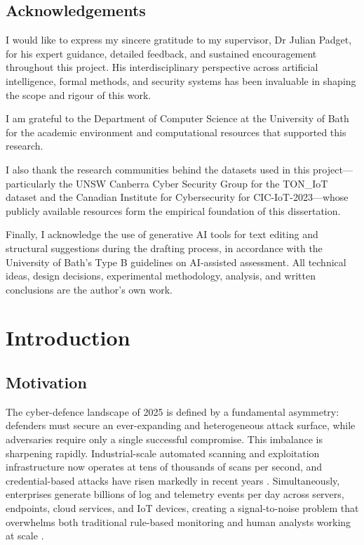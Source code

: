 \documentclass[12pt,a4paper]{report}
\begin{document}
\newpage
\section*{Acknowledgements}
I would like to express my sincere gratitude to my supervisor, Dr Julian Padget, for his expert guidance, detailed feedback, and sustained encouragement throughout this project. His interdisciplinary perspective across artificial intelligence, formal methods, and security systems has been invaluable in shaping the scope and rigour of this work.

I am grateful to the Department of Computer Science at the University of Bath for the academic environment and computational resources that supported this research.

I also thank the research communities behind the datasets used in this project---particularly the UNSW Canberra Cyber Security Group for the TON\_IoT dataset and the Canadian Institute for Cybersecurity for CIC-IoT-2023---whose publicly available resources form the empirical foundation of this dissertation.

Finally, I acknowledge the use of generative AI tools for text editing and structural suggestions during the drafting process, in accordance with the University of Bath's Type B guidelines on AI-assisted assessment. All technical ideas, design decisions, experimental methodology, analysis, and written conclusions are the author's own work.

\tableofcontents
\listoftables
\listoffigures

\chapter{Introduction}
\label{ch:introduction}

\section{Motivation}
\label{sec:motivation}

The cyber-defence landscape of 2025 is defined by a fundamental asymmetry: defenders must secure an ever-expanding and heterogeneous attack surface, while adversaries require only a single successful compromise. This imbalance is sharpening rapidly. Industrial-scale automated scanning and exploitation infrastructure now operates at tens of thousands of scans per second, and credential-based attacks have risen markedly in recent years \citep{fortinet2025}. Simultaneously, enterprises generate billions of log and telemetry events per day across servers, endpoints, cloud services, and IoT devices, creating a signal-to-noise problem that overwhelms both traditional rule-based monitoring and human analysts working at scale \citep{dang2023}.
\end{document}
